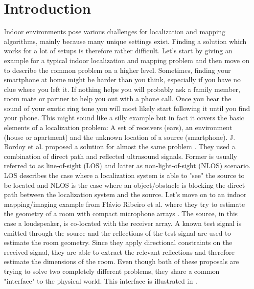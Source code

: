 \chapter{Introduction}\label{chap:introduction}
Indoor environments pose various challenges for localization and mapping algorithms, mainly because many unique settings exist.
Finding a solution which works for a lot of setups is therefore rather difficult. \newline
Let's start by giving an example for a typical indoor localization and mapping problem and then move on to describe the common problem on a higher level.\newline
Sometimes, finding your smartphone at home might be harder than you think, especially if you have no clue where you left it.
If nothing helps you will probably ask a family member, room mate or partner to help you out with a phone call.
Once you hear the sound of your exotic ring tone you will most likely start following it until you find your phone. \newline
This might sound like a silly example but in fact it covers the basic elements of a localization problem: A set of receivers (ears), an environment (house or apartment) and the unknown location of a source (smartphone).\newline
J. Bordoy et al. proposed a solution for almost the same problem \cite{bordoy2019exploiting}. 
They used a combination of direct path and reflected ultrasound signals. 
Former is usually referred to as line-of-sight (LOS) and latter as non-light-of-sight (NLOS) scenario.
LOS describes the case where a localization system is able to "see" the source to be located and NLOS is the case where an object/obstacle is blocking the direct path between the localization system and the source.\newline
Let's move on to an indoor mapping/imaging example from Flávio Ribeiro et al. where they try to estimate the geometry of a room with compact microphone arrays \cite{ribeiro2011geometrically}. 
The source, in this case a loudspeaker, is co-located with the receiver array. 
A known test signal is emitted through the source and the reflections of the test signal are used to estimate the room geometry. 
Since they apply directional constraints on the received signal, they are able to extract the relevant reflections and therefore estimate the dimensions of the room.\newline
Even though both of these proposals are trying to solve two completely different problems, they share a common "interface" to the physical world. 
This interface is illustrated in .

